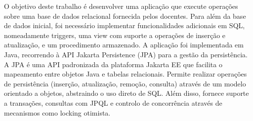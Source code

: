 \abstractPT  %

O objetivo deste trabalho é desenvolver uma aplicação que execute operações sobre uma base de dados relacional fornecida pelos docentes. Para além da base de dados inicial, foi necessário implementar funcionalidades adicionais em SQL, nomeadamente triggers, uma view com suporte a operações de inserção e atualização, e um procedimento armazenado.
A aplicação foi implementada em Java, recorrendo à API Jakarta Persistence (JPA) para a gestão da persistência.
A JPA é uma API padronizada da plataforma Jakarta EE que facilita o mapeamento entre objetos Java e tabelas relacionais. Permite realizar operações de persistência (inserção, atualização, remoção, consulta) através de um modelo orientado a objetos, abstraindo o uso direto de SQL. Além disso, fornece suporte a transações, consultas com JPQL e controlo de concorrência através de mecanismos como locking otimista.
